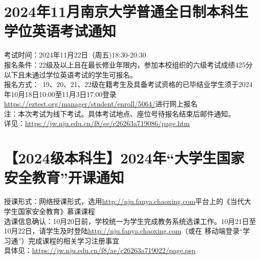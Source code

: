 \documentclass[letterpaper, 12pt]{article}
\begin{document}
\begin{multicols}{2}


\section{2024年11月南京大学普通全日制本科生学位英语考试通知}
考试时间：2024年11月22日（周五)18:30-20:30\\
报名条件：22级及以上且在最长修业年限内，参加本校组织的六级考试成绩425分以下且未通过学位英语考试的学生可报名。\\
报名方式： 19、20、21、22级在籍考生及具备考试资格的已毕结业学生须于2024年10月18日10:00至11月3日17:00登录\url{https://eztest.org/manager/student/enroll/5064/}进行网上报名\\
注：本次考试为线下考试。具体考试地点、座位号待报名结束后邮件通知。\\
详见：\url{https://jw.nju.edu.cn/f8/ee/c26263a719086/page.htm}\\

\section{【2024级本科生】2024年“大学生国家安全教育”开课通知}
授课形式：网络授课形式，选用\url{http://nju.fanya.chaoxing.com}平台上的《当代大学生国家安全教育》慕课课程\\
选课信息确认：10月20日前，学校统一为学生完成教务系统选课工作。10月21日至10月22日，请学生及时登陆\url{http://nju.fanya.chaoxing.com}（或在 移动端登录“学习通”）完成课程的相关学习注册事宜\\
具体见：\url{https://jw.nju.edu.cn/f8/ae/c26263a719022/page.psp}


\end{multicols}
\end{document}
